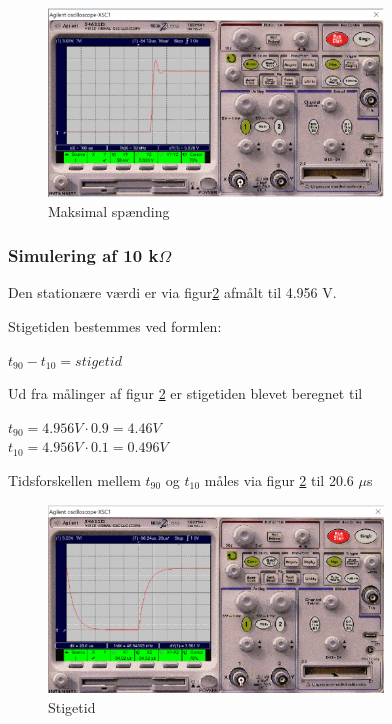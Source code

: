 \begin{figure}[h]
 \begin{center}
  \includegraphics[height=5cm]{P_Fig/figur9_1k_max}
  \caption{Maksimal spænding}
  \label{1k_max}
 \end{center}
\end{figure}

\subsubsection{Simulering af 10 k$\Omega$ }
Den stationære værdi er via figur\ref{10k.stigetid} afmålt til 4.956 V.

Stigetiden bestemmes ved formlen:
\begin{center}
$t_{90} - t_{10} = stigetid$
\end{center}

Ud fra målinger af figur \ref{10k.stigetid} er stigetiden blevet beregnet til

\begin{center}
$t_{90} = 4.956 V \cdot 0.9 = 4.46 V$
\\ 
$t_{10} = 4.956 V \cdot 0.1 = 0.496 V$
\end{center}

Tidsforskellen mellem $t_{90}$ og $t_{10}$ måles via figur \ref{10k.stigetid} til 20.6 $\mu$s

\begin{figure}[h]
 \begin{center}
  \includegraphics[height=5cm]{P_Fig/figur10_10k_stigetid}
  \caption{Stigetid}
  \label{10k.stigetid}
 \end{center}
\end{figure}


